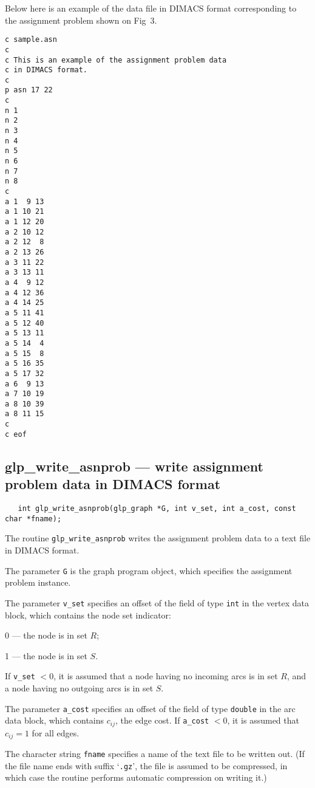 \documentclass[11pt]{report}
\def\para#1{\noindent{\bf#1}}
\def\synopsis{\para{Synopsis}}
\def\description{\para{Description}}
\begin{document}
\para{Example.} Below here is an example of the data file in DIMACS
format corresponding to the assignment problem shown on Fig~3.

\begin{footnotesize}
\begin{verbatim}
c sample.asn
c
c This is an example of the assignment problem data
c in DIMACS format.
c
p asn 17 22
c
n 1
n 2
n 3
n 4
n 5
n 6
n 7
n 8
c
a 1  9 13
a 1 10 21
a 1 12 20
a 2 10 12
a 2 12  8
a 2 13 26
a 3 11 22
a 3 13 11
a 4  9 12
a 4 12 36
a 4 14 25
a 5 11 41
a 5 12 40
a 5 13 11
a 5 14  4
a 5 15  8
a 5 16 35
a 5 17 32
a 6  9 13
a 7 10 19
a 8 10 39
a 8 11 15
c
c eof
\end{verbatim}
\end{footnotesize}

\subsection{glp\_write\_asnprob --- write assignment problem data in
DIMACS format}

\synopsis

\begin{verbatim}
   int glp_write_asnprob(glp_graph *G, int v_set, int a_cost, const char *fname);
\end{verbatim}

\description

The routine \verb|glp_write_asnprob| writes the assignment problem data
to a text file in DIMACS format.

The parameter \verb|G| is the graph program object, which specifies the
assignment problem instance.

The parameter \verb|v_set| specifies an offset of the field of type
\verb|int| in the vertex data block, which contains the node set
indicator:

0 --- the node is in set $R$;

1 --- the node is in set $S$.

\noindent
If \verb|v_set| $<0$, it is assumed that a node having no incoming arcs
is in set $R$, and a node having no outgoing arcs is in set $S$.

The parameter \verb|a_cost| specifies an offset of the field of type
\verb|double| in the arc data block, which contains $c_{ij}$, the edge
cost. If \verb|a_cost| $<0$, it is assumed that $c_{ij}=1$ for all
edges.

\newpage

The character string \verb|fname| specifies a name of the text file to
be written out. (If the file name ends with suffix `\verb|.gz|', the
file is assumed to be compressed, in which case the routine performs
automatic compression on writing it.)
\end{document}

